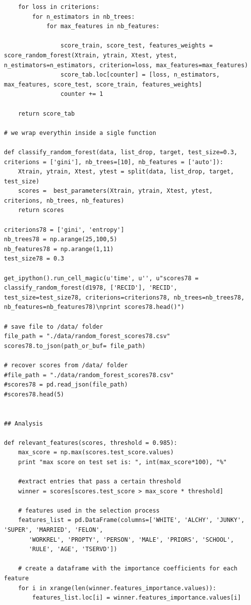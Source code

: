 \documentclass[a4paper]{article}
\theoremstyle{plain}
\begin{document}
\begin{lstlisting}
    for loss in criterions:
        for n_estimators in nb_trees:
            for max_features in nb_features:
                
                score_train, score_test, features_weights =                 score_random_forest(Xtrain, ytrain, Xtest, ytest, n_estimators=n_estimators, criterion=loss, max_features=max_features) 
                score_tab.loc[counter] = [loss, n_estimators, max_features, score_test, score_train, features_weights]
                counter += 1

    return score_tab

# we wrap everythin inside a sigle function

def classify_random_forest(data, list_drop, target, test_size=0.3, criterions = ['gini'], nb_trees=[10], nb_features = ['auto']):
    Xtrain, ytrain, Xtest, ytest = split(data, list_drop, target, test_size)
    scores =  best_parameters(Xtrain, ytrain, Xtest, ytest, criterions, nb_trees, nb_features)
    return scores

criterions78 = ['gini', 'entropy']
nb_trees78 = np.arange(25,100,5)
nb_features78 = np.arange(1,11)
test_size78 = 0.3

get_ipython().run_cell_magic(u'time', u'', u"scores78 =  classify_random_forest(d1978, ['RECID'], 'RECID', test_size=test_size78, criterions=criterions78, nb_trees=nb_trees78, nb_features=nb_features78)\nprint scores78.head()")

# save file to /data/ folder
file_path = "./data/random_forest_scores78.csv"
scores78.to_json(path_or_buf= file_path)

# recover scores from /data/ folder
#file_path = "./data/random_forest_scores78.csv"
#scores78 = pd.read_json(file_path)
#scores78.head(5)


## Analysis

def relevant_features(scores, threshold = 0.985):
    max_score = np.max(scores.test_score.values)
    print "max score on test set is: ", int(max_score*100), "%"
    
    #extract entries that pass a certain threshold
    winner = scores[scores.test_score > max_score * threshold]
    
    # features used in the selection process
    features_list = pd.DataFrame(columns=['WHITE', 'ALCHY', 'JUNKY', 'SUPER', 'MARRIED', 'FELON',
       'WORKREL', 'PROPTY', 'PERSON', 'MALE', 'PRIORS', 'SCHOOL',
       'RULE', 'AGE', 'TSERVD'])
    
    # create a dataframe with the importance coefficients for each feature
    for i in xrange(len(winner.features_importance.values)):
        features_list.loc[i] = winner.features_importance.values[i]
    

\end{lstlisting}
\end{document}
